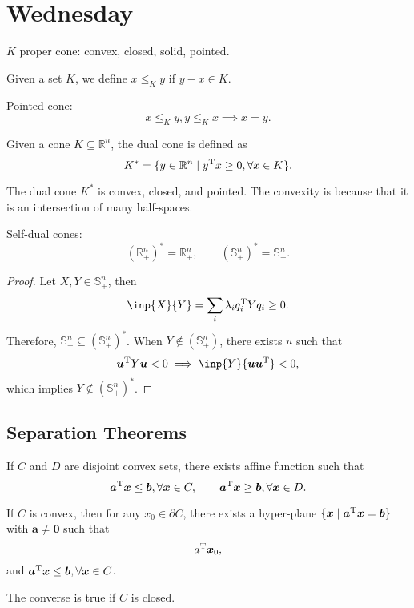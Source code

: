 
\section{Wednesday}

$K$ proper cone: convex, closed, solid, pointed.
\begin{definition}
Given a set $K$, 
we define $x\le_Ky$ if $y-x\in K$.
\end{definition}

Pointed cone:
\[
x\le_K y, y\le_K x\implies x=y.
\]

\begin{definition}
Given a cone $K\subseteq\mathbb{R}^n$, the dual cone is defined as
\[
K^* = \{y\in\mathbb{R}^n\mid y^{\mathrm T} x\ge0, \forall x\in K\}.
\]
\end{definition}
\begin{remark}
The dual cone $K^*$ is convex, closed, and pointed.
The convexity is because that it is an intersection of many half-spaces.
\end{remark}

Self-dual cones:
\[
(\mathbb{R}^n_+)^* = \mathbb{R}^n_+,\qquad
(\mathbb{S}_+^n)^* = \mathbb{S}_+^n.
\]
\begin{proof}
Let $X,Y\in\mathbb{S}_+^n$, then
\[
\inp{X}{Y} = \sum_i\lambda_iq_i\trans Yq_i\ge0.
\]
Therefore, $\mathbb{S}_+^n\subseteq (\mathbb{S}_+^n)^*$.
When $Y\notin(\mathbb{S}_+^n)$, there exists $u$ such that
\[
\bm u\trans Y\bm u<0
\implies
\inp{Y}{\bm u\bm u\trans}<0,
\]
which implies $Y\notin(\mathbb{S}_+^n)^*$.
\end{proof}

\subsection{Separation Theorems}
If $C$ and $D$ are disjoint convex sets, there exists affine function such that 
\[
\bm a^{\mathrm T}\bm x\le\bm b,\forall\bm x\in C,\qquad
\bm a^{\mathrm T}\bm x\ge\bm b,\forall \bm x\in D.
\]

\begin{theorem}
If $C$ is convex, then for any $x_0\in\partial C$, 
there exists a hyper-plane $\{\bm x\mid\bm a^{\mathrm T}\bm x=\bm b\}$ with $\bm a\ne\bm0$ such that
\[
a^{\mathrm T}\bm x_0,
\]
and $\bm a^{\mathrm T}\bm x\le\bm b,\forall\bm x\in C$.

The converse is true if $C$ is closed.
\end{theorem}











